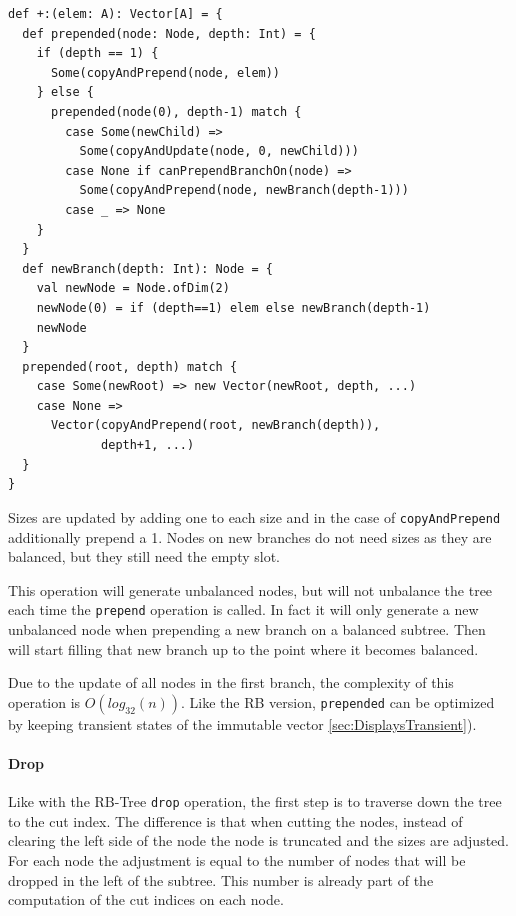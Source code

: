 \begin{lstlisting}[frame=single]
def +:(elem: A): Vector[A] = {
  def prepended(node: Node, depth: Int) = {
    if (depth == 1) {
      Some(copyAndPrepend(node, elem))
    } else {
      prepended(node(0), depth-1) match {
        case Some(newChild) => 
          Some(copyAndUpdate(node, 0, newChild)))
        case None if canPrependBranchOn(node) => 
          Some(copyAndPrepend(node, newBranch(depth-1)))
        case _ => None
    }
  }
  def newBranch(depth: Int): Node = {
    val newNode = Node.ofDim(2)
    newNode(0) = if (depth==1) elem else newBranch(depth-1)
    newNode
  }
  prepended(root, depth) match {
    case Some(newRoot) => new Vector(newRoot, depth, ...)  
    case None => 
      Vector(copyAndPrepend(root, newBranch(depth)), 
             depth+1, ...)
  }
}
\end{lstlisting}

Sizes are updated by adding one to each size and in the case of \texttt{copyAndPrepend} additionally prepend a 1. Nodes on new branches do not need sizes as they are balanced, but they still need the empty slot.

This operation will generate unbalanced nodes, but will not unbalance the tree each time the \texttt{prepend} operation is called. In fact it will only generate a new unbalanced node when prepending a new branch on a balanced subtree. Then will start filling that new branch up to the point where it becomes balanced. 

Due to the update of all nodes in the first branch, the complexity of this operation is $O(log_{32}(n))$. Like the RB version, \texttt{prepended} can be optimized by keeping transient states of the immutable vector \ref{sec:DisplaysTransient}).


\paragraph{Drop}

Like with the RB-Tree \texttt{drop} operation, the first step is to traverse down the tree to the cut index. The difference is that when cutting the nodes, instead of clearing the left side of the node the node is truncated and the sizes are adjusted. For each node the adjustment is equal to the number of nodes that will be dropped in the left of the subtree. This number is already part of the computation of the cut indices on each node.  

